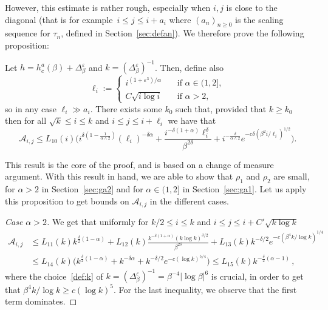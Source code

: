 \documentclass[10pt]{amsart}
\theoremstyle{definition}\newtheorem{defi}[theo]{Definition}\newtheorem{rema}[theo]{Remark}\newtheorem{exam}[theo]{Example}\newtheorem{exem}[theo]{Example}\newtheorem{nota}[theo]{Notation}
\newenvironment{step}[1]{\begin{proof}[{#1}]}{\let\qed\relax\end{proof}}
\newcommand{\ga}{\alpha}
\newcommand{\gb}{\beta}
\newcommand{\gd}{\delta}
\newcommand{\gep}{\varepsilon}
\newcommand{\gD}{\Delta}
\newcommand{\cA}{\ensuremath{\mathcal{A}}}
\begin{document}
However, this estimate is rather rough, especially when $i,j$ is close to the diagonal (that is for example~$i\leq j \leq i + a_i$ where ${(a_n)}_{n \ge 0}$ is the scaling sequence for $\tau_n$, defined in Section~\ref{sec:defan}). We therefore prove the following proposition:
\begin{prop}\label{prop:chgmeasure}
Let $h=h_c^a(\gb)+ \gD_{\gb}^\gep$ and $k=(\gD_\gb^{\gep})^{-1}$. Then, define also
\begin{equation}\label{def:ell}
\ell_i :=
\begin{cases}
i^{(1+\gep^3)/\ga} & \quad \text{if } \ga\in(1,2],\\
C \sqrt{i\log i} & \quad \text{if } \ga>2,
\end{cases}
\end{equation}
so in any case $\ell_i \gg a_i$. There exists some $k_0$ such that, provided that $k\geq k_0$ then for all $\sqrt{k}\leq i\leq k$ and $i\leq j\leq i+\ell_i$ we have that
\begin{equation}\label{boundAij}
\cA_{i,j} \leq L_{10}(i)\Big(i^{\gd(1-\frac{1}{\ga\wedge2})} (\ell_i)^{-\gd \ga} + \frac{i^{-\gd(1+\ga)} \ell_i^{\gd}}{\gb^{2 \gd}} + i^{-\frac{\gd}{\ga\wedge 2}} e^{- c \gd (\gb^2 i /\ell_i)^{1/2}} \Big).
\end{equation}
\end{prop}

This result is the core of the proof, and is based on a change of measure argument. With this result in hand, we are able to show that $\rho_1$ and $\rho_2$ are small, for $\ga>2$ in Section~\ref{sec:ga2} and for $\ga\in(1,2]$ in Section~\ref{sec:ga1}. Let us apply this proposition to get bounds on $\cA_{i,j}$ in the different cases.



\begin{step}{Case $\ga>2$}
We get that uniformly for $k/2 \leq i\leq k$ and $i\leq j\leq i+ C' \sqrt{k\log k}$
\begin{align}
\nonumber\cA_{i,j} & \leq L_{11}(k) k^{\frac{\gd}{2} (1-\ga)} + L_{12}(k) \frac{k^{-\gd (1+\ga)} (k \log k)^{\gd/2}}{\gb^{2 \gd}} + L_{13}(k) k^{- \gd/2} e^{- c (\gb^4 k /\log k)^{1/4}} \\
& \leq L_{14}(k) \Big(k^{\frac{\gd}{2} (1-\ga)} + k^{-\gd \ga} + k^{- \gd/2} e^{- c(\log k)^{5/4} }\Big) \leq L_{15}(k) k^{-\frac{\gd}{2} (\ga-1)}\,,\label{boundA2}
\end{align}
where the choice~\eqref{def:k} of $k=(\gD_{\gb}^{\gep})^{-1} = \gb^{-4} \mathopen|\log \gb|^{6}$ is crucial, in order to get that $\gb^4 k /\log k \geq c (\log k)^5$. For the last inequality, we observe that the first term dominates.
\end{step}
\end{document}
